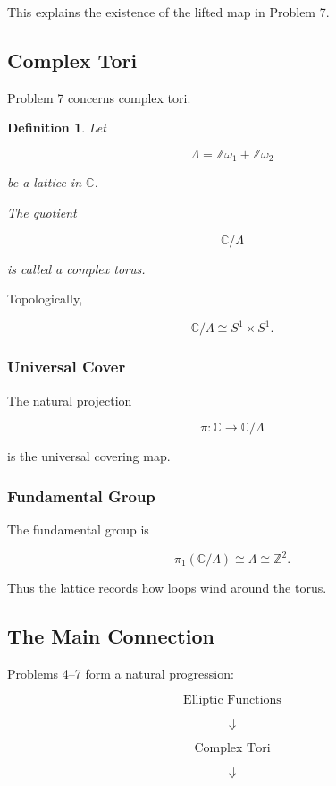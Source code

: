 \documentclass[12pt,a4paper]{article}
\theoremstyle{notespace}
\newtheorem{definition}{Definition}[subsection]
\begin{document}
This explains the existence of the lifted map in Problem 7.

\subsection{Complex Tori}

Problem 7 concerns complex tori.

\begin{definition}
	Let
	
	\[
	\Lambda
	=
	\mathbb Z\omega_1+\mathbb Z\omega_2
	\]
	
	be a lattice in \(\mathbb C\).
	
	The quotient
	
	\[
	\mathbb C/\Lambda
	\]
	
	is called a \emph{complex torus}.
\end{definition}

Topologically,

\[
\mathbb C/\Lambda
\cong
S^1\times S^1.
\]

\subsubsection*{Universal Cover}

The natural projection

\[
\pi:\mathbb C\to\mathbb C/\Lambda
\]

is the universal covering map.

\subsubsection*{Fundamental Group}

The fundamental group is

\[
\pi_1(\mathbb C/\Lambda)
\cong
\Lambda
\cong
\mathbb Z^2.
\]

Thus the lattice records how loops wind around the torus.

\subsection{The Main Connection}

Problems 4--7 form a natural progression:

\[
\boxed{\text{Elliptic Functions}}
\]

\[
\Downarrow
\]

\[
\boxed{\text{Complex Tori}}
\]

\[
\Downarrow
\]
\end{document}
